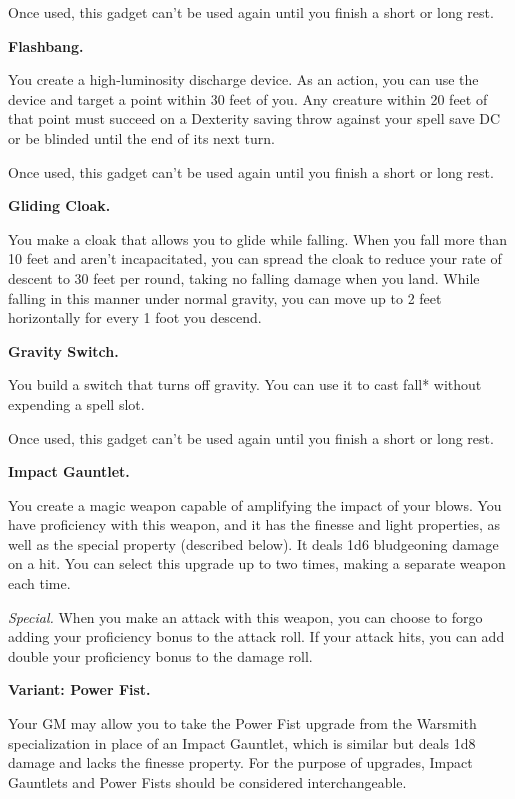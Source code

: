 \documentclass[11pt,twoside,openany]{book}  %
\begin{document}
\begin{fiveitemize}
	Once used, this gadget can’t be used again until you finish a short or long rest.

	\item \textbf{Flashbang.}
	
	You create a high-luminosity discharge device. As an action, you can use the device and target a point within 30 feet of you. Any creature within 20 feet of that point must succeed on a Dexterity saving throw against your spell save DC or be blinded until the end of its next turn.

	Once used, this gadget can’t be used again until you finish a short or long rest.

	\item \textbf{Gliding Cloak.}
	
	You make a cloak that allows you to glide while falling. When you fall more than 10 feet and aren’t incapacitated, you can spread the cloak to reduce your rate of descent to 30 feet per round, taking no falling damage when you land. While falling in this manner under normal gravity, you can move up to 2 feet horizontally for every 1 foot you descend.

	\item \textbf{Gravity Switch.}
	
	You build a switch that turns off gravity. You can use it to cast fall* without expending a spell slot.

	Once used, this gadget can’t be used again until you finish a short or long rest.

	\item \textbf{Impact Gauntlet.}
	
	You create a magic weapon capable of amplifying the impact of your blows. You have proficiency with this weapon, and it has the finesse and light properties, as well as the special property (described below). It deals 1d6 bludgeoning damage on a hit. You can select this upgrade up to two times, making a separate weapon each time.

	\textit{Special.} When you make an attack with this weapon, you can choose to forgo adding your proficiency bonus to the attack roll. If your attack hits, you can add double your proficiency bonus to the damage roll.
	\begin{fiveitemize}
	
		\item \textbf{Variant: Power Fist.}

		Your GM may allow you to take the Power Fist upgrade from the Warsmith specialization in place of an Impact Gauntlet, which is similar but deals 1d8 damage and lacks the finesse property. For the purpose of upgrades, Impact Gauntlets and Power Fists should be considered interchangeable.
	\end{fiveitemize}
	

\end{fiveitemize}
\end{document}
